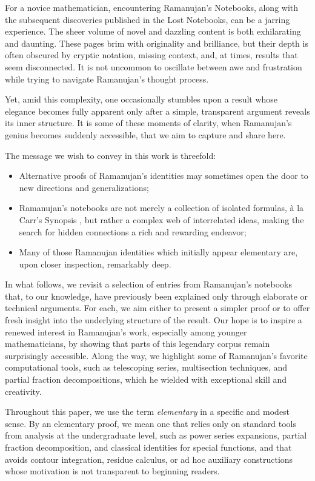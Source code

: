 \documentclass[11pt,oneside,reqno]{article}
\theoremstyle{definition}
\begin{document}
For a novice mathematician, encountering Ramanujan’s Notebooks, along with the subsequent discoveries published in the Lost Notebooks, can be a jarring experience. The sheer volume of novel and dazzling content is both exhilarating and daunting. These pages brim with originality and brilliance, but their depth is often obscured by cryptic notation, missing context, and, at times, results that seem disconnected. It is not uncommon to oscillate between awe and frustration while trying to navigate Ramanujan’s thought process.

Yet, amid this complexity, one occasionally stumbles upon a result whose elegance becomes fully apparent only after a simple, transparent argument reveals its inner structure. It is some of these moments of clarity, when Ramanujan’s genius becomes suddenly accessible, that we aim to capture and share here.

The message we wish to convey in this work is threefold:
\begin{itemize}
\item 
Alternative proofs of Ramanujan’s identities may sometimes open the door to new directions and generalizations;
\item 
Ramanujan’s notebooks are not merely a collection of isolated formulas, à la Carr’s Synopsis \cite{Carr}, but rather a complex web of interrelated ideas, making the search for hidden connections a rich and rewarding endeavor;
\item 
Many of those Ramanujan
identities which initially appear elementary are, upon closer inspection, remarkably deep.
\end{itemize} 
In what follows, we revisit a selection of entries from Ramanujan’s notebooks that, to our knowledge, have previously been explained only through elaborate or technical arguments. For each, we aim either to present a simpler proof or to offer fresh insight into the underlying structure of the result. Our hope is to inspire a renewed interest in Ramanujan’s work, especially among younger mathematicians, by showing that parts of this legendary corpus remain surprisingly accessible. Along the way, we highlight some of Ramanujan’s favorite computational tools, such as telescoping series, multisection techniques, and partial fraction decompositions, which he wielded with exceptional skill and creativity.

Throughout this paper, we use the term \emph{elementary} in a specific and modest sense. By an elementary proof, we mean one that relies only on standard tools from analysis at the undergraduate level, such as power series expansions, partial fraction decomposition, and classical identities for special functions, and that avoids contour integration, residue calculus, or ad hoc auxiliary constructions whose motivation is not transparent to beginning readers.
\end{document}
